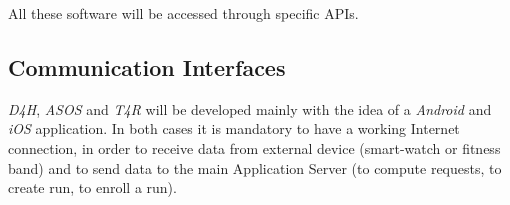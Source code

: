 All these software will be accessed through specific APIs.

\subsection{Communication Interfaces}
%
\emph{D4H}, \emph{ASOS} and \emph{T4R} will be developed mainly with the idea of a \emph{Android} and \emph{iOS} application. In both cases it is mandatory to have a working Internet connection, in order to receive data from external device (smart-watch or fitness band) and to send data  to the main Application Server (to compute requests, to create run, to enroll a run).
